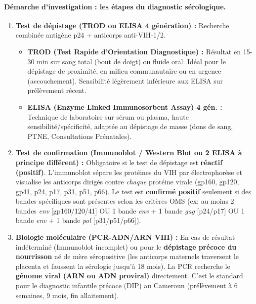 \documentclass[11pt]{article}
\begin{document}
\paragraph{Démarche d'investigation : les étapes du diagnostic sérologique.}
\begin{enumerate}
    \item \textbf{Test de dépistage (TROD ou ELISA 4 génération) :} Recherche combinée antigène p24 + anticorps anti-VIH-1/2.
    \begin{itemize}
        \item \textbf{TROD (Test Rapide d'Orientation Diagnostique) :} Résultat en 15-30 min sur sang total (bout de doigt) ou fluide oral. Idéal pour le dépistage de proximité, en milieu communautaire ou en urgence (accouchement). Sensibilité légèrement inférieure aux ELISA sur prélèvement récent.
        \item \textbf{ELISA (Enzyme Linked Immunosorbent Assay) 4 gén. :} Technique de laboratoire sur sérum ou plasma, haute sensibilité/spécificité, adaptée au dépistage de masse (dons de sang, PTNE, Consultations Prénatales).
    \end{itemize}
    \item \textbf{Test de confirmation (Immunoblot / Western Blot ou 2 ELISA à principe différent) :} Obligatoire si le test de dépistage est \textbf{réactif (positif)}. L'immunoblot sépare les protéines du VIH par électrophorèse et visualise les anticorps dirigés contre \emph{chaque} protéine virale (gp160, gp120, gp41, p24, p17, p31, p51, p66). Le test est \textbf{confirmé positif} seulement si des bandes spécifiques sont présentes selon les critères OMS (ex: au moins 2 bandes \emph{env} [gp160/120/41] OU 1 bande \emph{env} + 1 bande \emph{gag} [p24/p17] OU 1 bande \emph{env} + 1 bande \emph{pol} [p31/p51/p66]).
    \item \textbf{Biologie moléculaire (PCR-ADN/ARN VIH) :} En cas de résultat indéterminé (Immunoblot incomplet) ou pour le \textbf{dépistage précoce du nourrisson} né de mère séropositive (les anticorps maternels traversent le placenta et faussent la sérologie jusqu'à 18 mois). La PCR recherche le \textbf{génome viral (ARN ou ADN proviral)} directement. C'est le standard pour le diagnostic infantile précoce (DIP) au Cameroun (prélèvement à 6 semaines, 9 mois, fin allaitement).
\end{enumerate}
\end{document}
